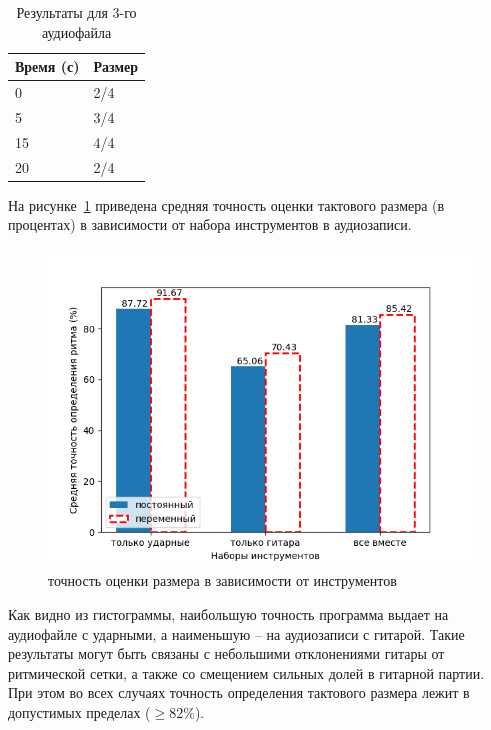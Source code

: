 \begin{table}[!h]
	\begin{center}
		\caption{\label{tab:hz_full}Результаты для 3-го аудиофайла}
		\begin{tabular}{|p{8cm}|p{8cm}|}
			\hline
			Время (с) & Размер\\
			\hline
			0 & 2/4\\
			\hline
			5 & 3/4\\
			\hline
			15 & 4/4\\
			\hline
			20 & 2/4\\
			\hline
		\end{tabular}
	\end{center}
\end{table}

\newpage

На рисунке~\ref{img:measure_instr} приведена средняя точность оценки тактового размера (в процентах) в зависимости от набора инструментов в аудиозаписи.

\begin{figure}[h]
	\centering
	\includegraphics[scale=0.89]{../graphs/measure_instr.png}
	\caption{точность оценки размера в зависимости от инструментов}
	\label{img:measure_instr}
\end{figure}

\newpage

Как видно из гистограммы, наибольшую точность программа выдает на аудиофайле с ударными, а наименьшую -- на аудиозаписи с гитарой. Такие результаты могут быть связаны с небольшими отклонениями гитары от ритмической сетки, а также со смещением сильных долей в гитарной партии. При этом во всех случаях точность определения тактового размера лежит в допустимых пределах ($\ge82\%$).

